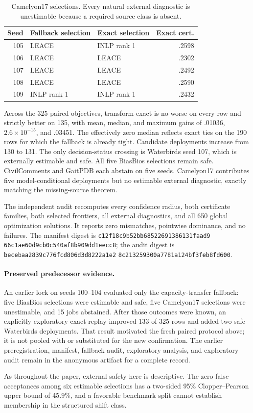 \begin{table}[t]
\centering
\small
\setlength{\tabcolsep}{4.0pt}
\begin{tabular}{rllr}
\hline
Seed & Fallback selection & Exact selection & Exact cert. \\
\hline
105 & LEACE & INLP rank 1 & .2598 \\
106 & LEACE & LEACE & .2302 \\
107 & LEACE & LEACE & .2492 \\
108 & LEACE & LEACE & .2590 \\
109 & INLP rank 1 & INLP rank 1 & .2432 \\
\hline
\end{tabular}
\caption{Camelyon17 selections. Every natural external diagnostic is
unestimable because a required source class is absent.}
\label{supp:tab:cam-exact-selections}
\end{table}

Across the 325 paired objectives, transform-exact is no worse on every row and
strictly better on 135, with mean, median, and maximum gains of .01036,
$2.6\times10^{-15}$, and .03451. The effectively zero median reflects exact
ties on the 190 rows for which the fallback is already tight. Candidate
deployments increase from 130 to 131. The only decision-status crossing is
Waterbirds seed 107, which is externally estimable and safe. All five BiasBios
selections remain safe. CivilComments and GaitPDB each abstain on five seeds.
Camelyon17 contributes five model-conditional deployments but no estimable
external diagnostic, exactly matching the missing-source theorem.

The independent audit recomputes every confidence radius, both certificate
families, both selected frontiers, all external diagnostics, and all 650 global
optimization solutions. It reports zero mismatches, pointwise dominance, and
no failures. The manifest digest is
\texttt{c12f18c9b52bb68522691386131faad9}\allowbreak
\texttt{66c1ae60d9cb0c540af8b909dd1eecc8}; the audit digest is
\texttt{becebaa2839c776fcd806d3d8222a1e2}\allowbreak
\texttt{8c213259300a7781a124bf3feb8fd600}.

\paragraph{Preserved predecessor evidence.}
An earlier lock on seeds 100--104 evaluated only the capacity-transfer
fallback: five BiasBios selections were estimable and safe, five Camelyon17
selections were unestimable, and 15 jobs abstained. After those outcomes were
known, an explicitly exploratory exact replay improved 133 of 325 rows and
added two safe Waterbirds deployments. That result motivated the fresh paired
protocol above; it is not pooled with or substituted for the new confirmation.
The earlier preregistration, manifest, fallback audit, exploratory analysis,
and exploratory audit remain in the anonymous artifact for a complete record.

As throughout the paper, external safety here is descriptive. The zero false
acceptances among six estimable selections has a two-sided 95\% Clopper--Pearson
upper bound of 45.9\%, and a favorable benchmark split cannot establish
membership in the structured shift class.
